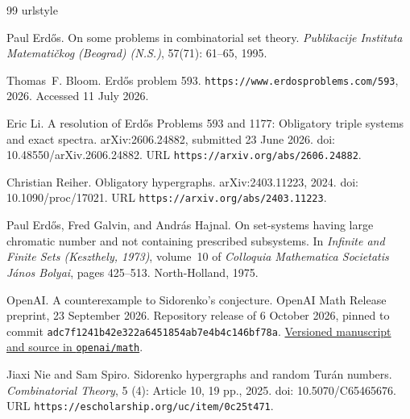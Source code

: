 \documentclass[a4paper,11pt,reqno]{amsart}
\theoremstyle{plain}
\theoremstyle{definition}
\theoremstyle{remark}
\begin{document}
\begin{thebibliography}{99}
\providecommand{\natexlab}[1]{#1}
\providecommand{\url}[1]{\texttt{#1}}
\expandafter\ifx\csname urlstyle\endcsname\relax
  \providecommand{\doi}[1]{doi: #1}\else
  \providecommand{\doi}{doi: \begingroup \urlstyle{rm}\Url}\fi

Paul Erd{\H{o}}s.
\newblock On some problems in combinatorial set theory.
\newblock \emph{Publikacije Instituta Matemati\v{c}kog (Beograd) (N.S.)},
  57(71): 61--65, 1995.

Thomas~F. Bloom.
\newblock Erd{\H{o}}s problem 593.
\newblock \url{https://www.erdosproblems.com/593}, 2026.
\newblock Accessed 11 July 2026.

Eric Li.
\newblock A resolution of {Erd{\H{o}}s Problems 593 and 1177}: Obligatory
  triple systems and exact spectra.
\newblock arXiv:2606.24882, submitted 23 June 2026.
\newblock \doi{10.48550/arXiv.2606.24882}.
\newblock URL \url{https://arxiv.org/abs/2606.24882}.

Christian Reiher.
\newblock Obligatory hypergraphs.
\newblock arXiv:2403.11223, 2024.
\newblock \doi{10.1090/proc/17021}.
\newblock URL \url{https://arxiv.org/abs/2403.11223}.

Paul Erd{\H{o}}s, Fred Galvin, and Andr{\'a}s Hajnal.
\newblock On set-systems having large chromatic number and not containing
  prescribed subsystems.
\newblock In \emph{Infinite and Finite Sets (Keszthely, 1973)}, volume~10 of
  \emph{Colloquia Mathematica Societatis J{\'a}nos Bolyai}, pages 425--513.
  North-Holland, 1975.

OpenAI.
\newblock A counterexample to {Sidorenko}'s conjecture.
\newblock OpenAI Math Release preprint, 23 September 2026.
\newblock Repository release of 6 October 2026, pinned to commit
  \texttt{adc7f1241b42e322a6451854ab7e4b4c146bf78a}.
\newblock \href{https://github.com/openai/math/blob/adc7f1241b42e322a6451854ab7e4b4c146bf78a/preprints/A-counterexample-to-Sidorenkos-conjecture-September-23-2026/paper.pdf}{Versioned manuscript and source in \texttt{openai/math}}.

Jiaxi Nie and Sam Spiro.
\newblock Sidorenko hypergraphs and random {Tur\'an} numbers.
\newblock \emph{Combinatorial Theory}, 5 (4):
  Article 10, 19 pp., 2025.
\newblock \doi{10.5070/C65465676}.
\newblock URL \url{https://escholarship.org/uc/item/0c25t471}.


\end{thebibliography}
\end{document}
